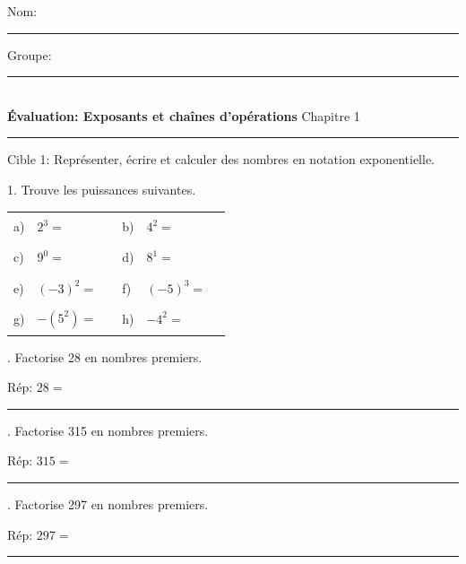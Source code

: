 \documentclass[11pt]{article}
\newcommand{\entete}{%
  \noindent Nom: \rule{6.5cm}{0.4pt} \hfill Groupe: \rule{3cm}{0.4pt}\\[4mm]
}
\begin{document}
\entete
\noindent \textbf{Évaluation: Exposants et chaînes d'opérations} \hfill Chapitre 1
\vspace{2mm}
\hrule
\vspace{4mm}

\begin{cible}{Cible 1: Représenter, écrire et calculer des nombres en notation exponentielle.}

1. Trouve les puissances suivantes.
\vspace{2mm}

\begin{tabular}{@{}p{0.5cm}p{2.3cm}p{4.3cm}p{0.5cm}p{2.3cm}p{4.3cm}@{}}
a) & $2^3 = $ & \rule{3.2cm}{0.4pt} & b) & $4^2 = $ & \rule{3.2cm}{0.4pt} \\[4mm]
c) & $9^0 = $ & \rule{3.2cm}{0.4pt} & d) & $8^1 = $ & \rule{3.2cm}{0.4pt} \\[4mm]
e) & $(-3)^2 = $ & \rule{3.2cm}{0.4pt} & f) & $(-5)^3 = $ & \rule{3.2cm}{0.4pt} \\[4mm]
g) & $-(5^2) = $ & \rule{3.2cm}{0.4pt} & h) & $-4^2 = $ & \rule{3.2cm}{0.4pt} \\
\end{tabular}

\vspace{6mm}
. Factorise 28 en nombres premiers.

\vspace{2.5cm}

\noindent Rép: $28 = $ \rule{3.5cm}{0.4pt}


\vspace{6mm}
. Factorise 315 en nombres premiers.

\vspace{2.5cm}

\noindent Rép: $315 = $ \rule{3.5cm}{0.4pt}

\vspace{6mm}

. Factorise 297 en nombres premiers.

\vspace{2.5cm}

\noindent Rép: $297 = $ \rule{3.5cm}{0.4pt}
\vspace{4mm}
\end{cible}


\newpage

\end{document}
